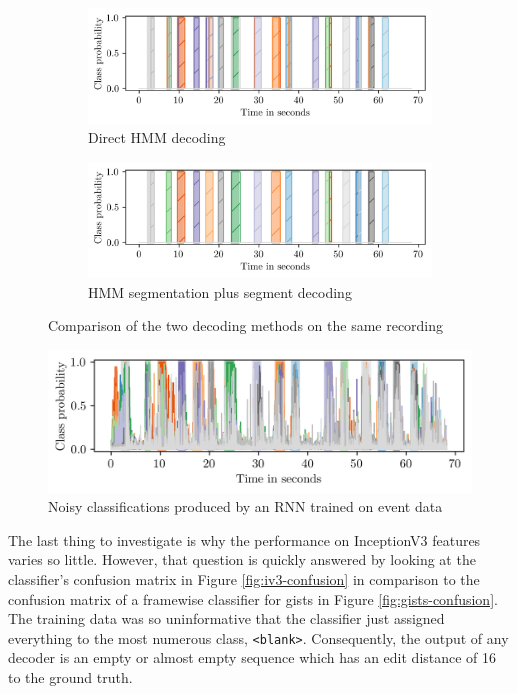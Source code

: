 \begin{figure}[h]
  \centering
  \begin{subfigure}{\textwidth}
    \centering
    \includegraphics{figures/results/decoded/decoded}
    \caption{Direct HMM decoding}
  \end{subfigure}
  \begin{subfigure}{\textwidth}
    \centering
    \includegraphics{figures/results/decoded/segmented}
    \caption{HMM segmentation plus segment decoding}
  \end{subfigure}
  \caption{Comparison of the two decoding methods on the same recording}
  \label{fig:decoded}
\end{figure}

\begin{figure}[h]
  \centering
  \includegraphics[width=6in]{figures/results/event-classifications.png}
  \caption{Noisy classifications produced by an RNN trained on event data}
  \label{fig:event-cls}
\end{figure}

The last thing to investigate is why the performance on InceptionV3 features
varies so little. However, that question is quickly answered by looking at the
classifier's confusion matrix in Figure \ref{fig:iv3-confusion} in comparison to
the confusion matrix of a framewise classifier for gists in Figure
\ref{fig:gists-confusion}. The training data was so uninformative that the
classifier just assigned everything to the most numerous class,
\texttt{<blank>}. Consequently, the output of any decoder is an empty or almost
empty sequence which has an edit distance of 16 to the ground truth.

